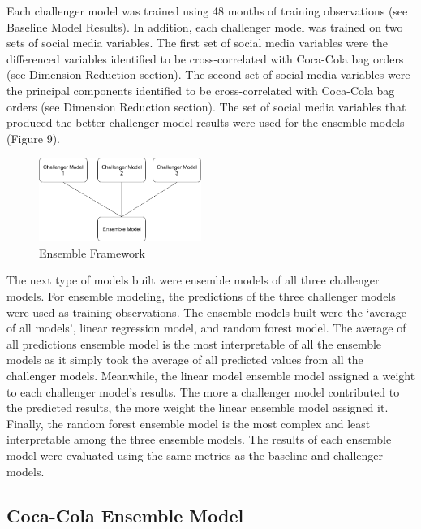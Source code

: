 \documentclass[12pt,oneside]{chicagocapstone}
\begin{document}
Each challenger model was trained using 48 months of training observations (see Baseline Model Results). In addition, each challenger model was trained on two sets of social media variables. The first set of social media variables were the differenced variables identified to be cross-correlated with Coca-Cola bag orders (see Dimension Reduction section). The second set of social media variables were the principal components identified to be cross-correlated with Coca-Cola bag orders (see Dimension Reduction section). The set of social media variables that produced the better challenger model results were used for the ensemble models (Figure 9).
\begin{figure}

{\centering \includegraphics[width=200px,angle = 0, scale=2.1]{figure/socialmedia_ensemble_framework} 

}

\caption{Ensemble Framework}\label{fig:GoogleTrends2}
\end{figure}
The next type of models built were ensemble models of all three challenger models. For ensemble modeling, the predictions of the three challenger models were used as training observations. The ensemble models built were the `average of all models', linear regression model, and random forest model. The average of all predictions ensemble model is the most interpretable of all the ensemble models as it simply took the average of all predicted values from all the challenger models. Meanwhile, the linear model ensemble model assigned a weight to each challenger model's results. The more a challenger model contributed to the predicted results, the more weight the linear ensemble model assigned it. Finally, the random forest ensemble model is the most complex and least interpretable among the three ensemble models. The results of each ensemble model were evaluated using the same metrics as the baseline and challenger models.

\hypertarget{coca-cola-ensemble-model}{%
\subsection*{Coca-Cola Ensemble Model}\label{coca-cola-ensemble-model}}
\end{document}
